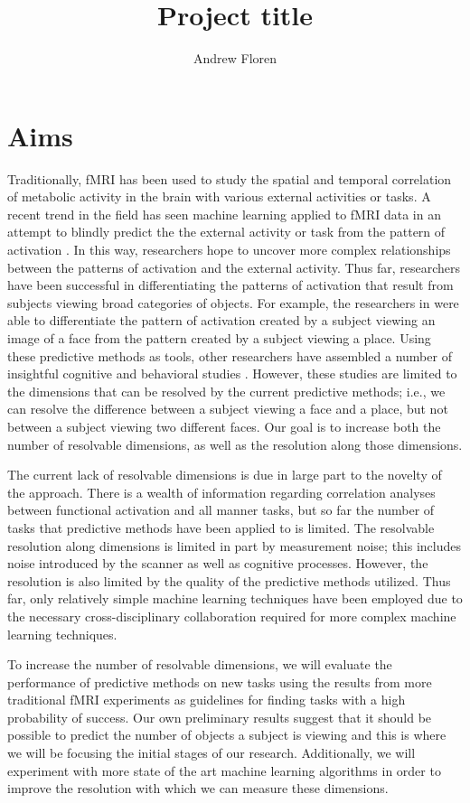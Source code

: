 \documentclass[12pt]{article}
\title{Project title}
\author{Andrew Floren}
\date{}
\begin{document}
\maketitle{}

\section{Aims}
Traditionally, fMRI has been used to study the spatial and temporal correlation of metabolic activity in the brain with various external activities or tasks.
A recent trend in the field has seen machine learning applied to fMRI data in an attempt to blindly predict the the external activity or task from the pattern of activation \cite{a,b,c}.
In this way, researchers hope to uncover more complex relationships between the patterns of activation and the external activity.
Thus far, researchers have been successful in differentiating the patterns of activation that result from subjects viewing broad categories of objects.
For example, the researchers in \cite{a} were able to differentiate the pattern of activation created by a subject viewing an image of a face from the pattern created by a subject viewing a place.
Using these predictive methods as tools, other researchers have assembled a number of insightful cognitive and behavioral studies \cite{d,e,f}.
However, these studies are limited to the dimensions that can be resolved by the current predictive methods; i.e., we can resolve the difference between a subject viewing a face and a place, but not between a subject viewing two different faces.
Our goal is to increase both the number of resolvable dimensions, as well as the resolution along those dimensions.

The current lack of resolvable dimensions is due in large part to the novelty of the approach.
There is a wealth of information regarding correlation analyses between functional activation and all manner tasks, but so far the number of tasks that predictive methods have been applied to is limited.
The resolvable resolution along dimensions is limited in part by measurement noise; this includes noise introduced by the scanner as well as cognitive processes.
However, the resolution is also limited by the quality of the predictive methods utilized.
Thus far, only relatively simple machine learning techniques have been employed due to the necessary cross-disciplinary collaboration required for more complex machine learning techniques.

To increase the number of resolvable dimensions, we will evaluate the performance of predictive methods on new tasks using the results from more traditional fMRI experiments as guidelines for finding tasks with a high probability of success.
Our own preliminary results suggest that it should be possible to predict the number of objects a subject is viewing and this is where we will be focusing the initial stages of our research. 
Additionally, we will experiment with more state of the art machine learning algorithms in order to improve the resolution with which we can measure these dimensions.
\end{document}
